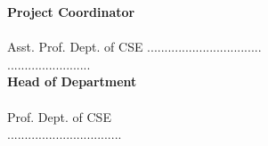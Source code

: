 \begin{titlepage}
 \hfill  {\bf Project Coordinator} \\[.3cm]
\noindent \vguide \hfill \\  Asst. Prof. Dept. of CSE  \hfill .................................\\........................ \\   \hfill  \hspace*{\fill} {\bf Head of Department}\noindent  \\[.3cm]\hspace*{\fill} \hfill\vhod  \\\hspace*{\fill}\hfill  Prof. Dept. of CSE \\\hspace*{\fill}
\hfill .................................\\ 



%
\end{titlepage}

%  